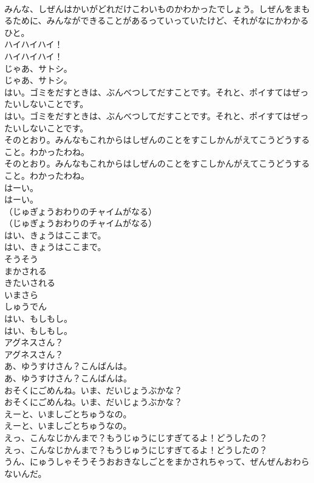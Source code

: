\documentclass[8pt]{extreport}
\begin{document}
\begin{CJK}{UTF8}{min}
\\	みんな、しぜんはかいがどれだけこわいものかわかったでしょう。しぜんをまもるために、みんなができることがあるっていっていたけど、それがなにかわかるひと。 
\\	ハイハイハイ！	
\\	ハイハイハイ！ 
\\	じゃあ、サトシ。	
\\	じゃあ、サトシ。 
\\	はい。ゴミをだすときは、ぶんべつしてだすことです。それと、ポイすてはぜったいしないことです。	
\\	はい。ゴミをだすときは、ぶんべつしてだすことです。それと、ポイすてはぜったいしないことです。 
\\	そのとおり。みんなもこれからはしぜんのことをすこしかんがえてこうどうすること。わかったわね。	
\\	そのとおり。みんなもこれからはしぜんのことをすこしかんがえてこうどうすること。わかったわね。 
\\	はーい。	
\\	はーい。 
\\	（じゅぎょうおわりのチャイムがなる）	
\\	（じゅぎょうおわりのチャイムがなる） 
\\	はい、きょうはここまで。	
\\	はい、きょうはここまで。 
\\	そうそう
\\	まかされる
\\	きたいされる
\\	いまさら
\\	しゅうでん
\\	はい、もしもし。	
\\	はい、もしもし。 
\\	アグネスさん？	
\\	アグネスさん？ 
\\	あ、ゆうすけさん？こんばんは。	
\\	あ、ゆうすけさん？こんばんは。 
\\	おそくにごめんね。いま、だいじょうぶかな？	
\\	おそくにごめんね。いま、だいじょうぶかな？ 
\\	えーと、いましごとちゅうなの。	
\\	えーと、いましごとちゅうなの。 
\\	えっ、こんなじかんまで？もうじゅうにじすぎてるよ！どうしたの？	
\\	えっ、こんなじかんまで？もうじゅうにじすぎてるよ！どうしたの？ 
\\	うん、にゅうしゃそうそうおおきなしごとをまかされちゃって、ぜんぜんおわらないんだ。	

\end{CJK}
\end{document}
